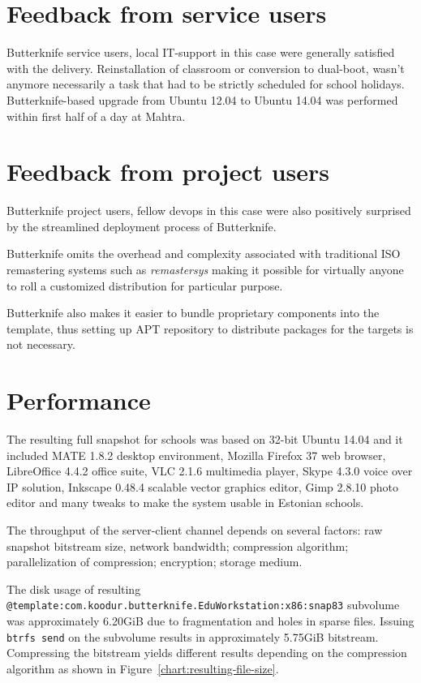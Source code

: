 \documentclass[a4paper,11pt]{kth-mag}
\begin{document}
\section{Feedback from service users}

Butterknife service users, local IT-support in this case
were generally satisfied with the delivery.
Reinstallation of classroom or conversion to dual-boot,
wasn't anymore necessarily a task that had to
be strictly scheduled for school holidays.
Butterknife-based upgrade from Ubuntu 12.04 to
Ubuntu 14.04 was performed within first
half of a day at Mahtra.

\section{Feedback from project users}

Butterknife project users, fellow devops in this case
were also positively surprised by the
streamlined deployment process of Butterknife.

Butterknife omits the overhead
and complexity associated with traditional
ISO remastering systems such as \emph{remastersys}
\cite{livecd-customization}
making it possible for virtually anyone
to roll a customized distribution
for particular purpose.

Butterknife also makes it easier to
bundle proprietary components
into the template, thus setting up APT repository to distribute
packages for the targets is not necessary.


\section{Performance}

The resulting full snapshot for schools was based on 32-bit Ubuntu 14.04 and
it included MATE 1.8.2 desktop environment, Mozilla Firefox 37 web browser,
LibreOffice 4.4.2 office suite,
VLC 2.1.6 multimedia player,
Skype 4.3.0 voice over IP solution,
Inkscape 0.48.4 scalable vector graphics editor,
Gimp 2.8.10 photo editor and many tweaks
to make the system usable in Estonian schools.

The throughput of the server-client channel depends on
several factors:
raw snapshot bitstream size,
network bandwidth;
compression algorithm;
parallelization of compression;
encryption;
storage medium.

The disk usage of resulting
\lstinline{@template:com.koodur.butterknife.EduWorkstation:x86:snap83}
subvolume was approximately 6.20GiB
due to fragmentation and holes in sparse files.
Issuing \lstinline{btrfs send} on the subvolume
results in approximately 5.75GiB bitstream.
Compressing the bitstream yields different
results depending on the compression algorithm as
shown in Figure~\ref{chart:resulting-file-size}.
\end{document}
